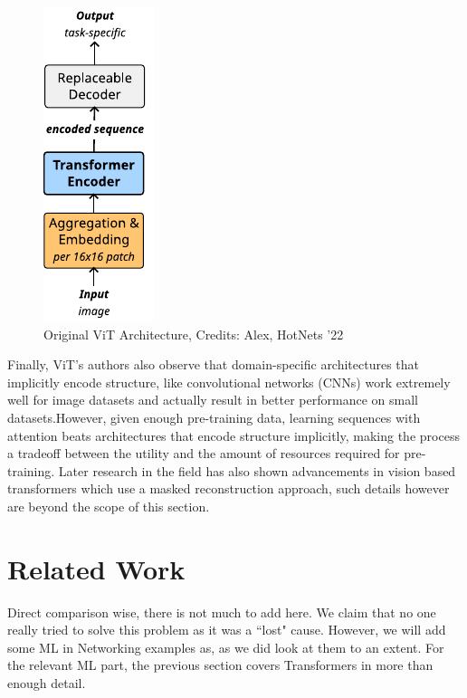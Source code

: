 \begin{figure}[!hbt]
  \begin{center}
    \includegraphics[scale=1.5]{figures/architecture_vit.pdf}
    \caption{Original ViT Architecture, Credits: Alex, HotNets '22}
    \label{fig:vit}
  \end{center}
\end{figure}


Finally, ViT's authors also observe that domain-specific architectures that implicitly encode structure, like convolutional networks (CNNs) work extremely well for image datasets and  actually result in better performance on small datasets.However, given enough pre-training data, learning sequences with attention beats architectures that encode structure implicitly, making the process a tradeoff between the utility and the amount of resources required for pre-training. Later research in the field has also shown advancements in vision based transformers which use a masked reconstruction approach\cite{heMaskedAutoencodersAre2021}, such details however are beyond the scope of this section. 


\section{Related Work}
\label{sec:related_work}

Direct comparison wise, there is not much to add here. We claim that no one really tried to solve this problem as it was a ``lost" cause. However, we will add some ML in Networking examples as, as we did look at them to an extent. For the relevant ML part, the previous section covers Transformers in more than enough detail.

